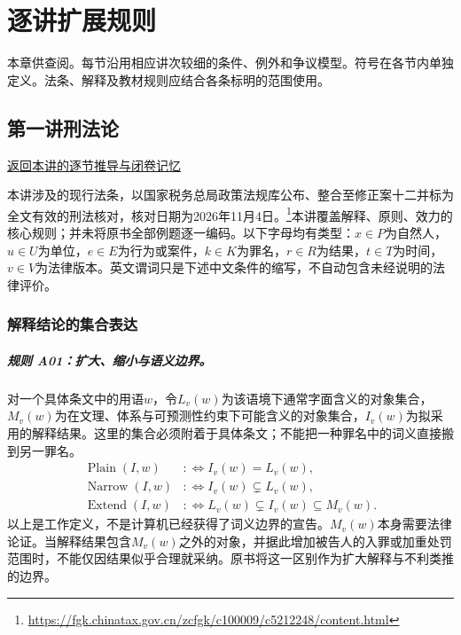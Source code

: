 \chapter{逐讲扩展规则}

本章供查阅。每节沿用相应讲次较细的条件、例外和争议模型。符号在各节内单独定义。法条、解释及教材规则应结合各条标明的范围使用。

\section{第一讲\quad 刑法论}

\label{ref:lecture:01}

\noindent\hyperref[lecture:01]{返回本讲的逐节推导与闭卷记忆}

本讲涉及的现行法条，以国家税务总局政策法规库公布、整合至修正案十二并标为全文有效的刑法核对，核对日期为2026年11月4日。\footnote{\url{https://fgk.chinatax.gov.cn/zcfgk/c100009/c5212248/content.html}}本讲覆盖解释、原则、效力的核心规则；并未将原书全部例题逐一编码。以下字母均有类型：$x\in P$为自然人，$u\in U$为单位，$e\in E$为行为或案件，$k\in K$为罪名，$r\in R$为结果，$t\in T$为时间，$v\in V$为法律版本。英文谓词只是下述中文条件的缩写，不自动包含未经说明的法律评价。

\subsection{解释结论的集合表达}
\paragraph{规则 A01：扩大、缩小与语义边界。}
对一个具体条文中的用语$w$，令$L_v(w)$为该语境下通常字面含义的对象集合，$M_v(w)$为在文理、体系与可预测性约束下可能含义的对象集合，$I_v(w)$为拟采用的解释结果。这里的集合必须附着于具体条文；不能把一种罪名中的词义直接搬到另一罪名。
\[
\begin{aligned}
\operatorname{Plain}(I,w)&:\!\iff I_v(w)=L_v(w),\\
\operatorname{Narrow}(I,w)&:\!\iff I_v(w)\subsetneq L_v(w),\\
\operatorname{Extend}(I,w)&:\!\iff L_v(w)\subsetneq I_v(w)
                         \subseteq M_v(w).
\end{aligned}
\]
以上是工作定义，不是计算机已经获得了词义边界的宣告。$M_v(w)$本身需要法律论证。当解释结果包含$M_v(w)$之外的对象，并据此增加被告人的入罪或加重处罚范围时，不能仅因结果似乎合理就采纳。原书将这一区别作为扩大解释与不利类推的边界。

